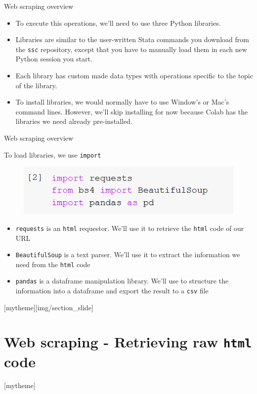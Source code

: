 \documentclass[aspectratio=169]{beamer}
\newcommand{\sectionpic}[2]{
	\setbeamertemplate{section page}[mytheme][#2]
	\section{#1}
	\setbeamertemplate{section page}[mytheme]
}
\begin{document}
\begin{frame}{Web scraping overview}

	\begin{itemize}	
		\item To execute this operations, we'll need to use three Python libraries.
		\item Libraries are similar to the user-written Stata commands you download from the \texttt{ssc} repository, except that you have to manually load them in each new Python session you start.
		\item Each library has custom made data types with operations specific to the topic of the library.
		\item To install libraries, we would normally have to use Window's or Mac's command lines. However, we'll skip installing for now because Colab has the libraries we need already pre-installed.
	\end{itemize}

\end{frame}

\begin{frame}{Web scraping overview}

	To load libraries, we use \texttt{import}

	\begin{figure}
		\centering
		\includegraphics[width=0.4\linewidth]{img/libraries.png}
	\end{figure}

	\begin{itemize}
		\item \texttt{requests} is an \texttt{html} requestor. We'll use it to retrieve the \texttt{html} code of our URL
		\item \texttt{BeautifulSoup} is a text parser. We'll use it to extract the information we need from the \texttt{html} code
		\item \texttt{pandas} is a dataframe manipulation library. We'll use to structure the information into a dataframe and export the result to a \texttt{csv} file
	\end{itemize}

\end{frame}

\sectionpic{Web scraping - Retrieving raw \texttt{html} code}{img/section_slide}
\end{document}
